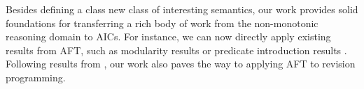 Besides defining a class new class of interesting semantics, our work provides solid foundations for transferring a rich body of work from the non-monotonic reasoning domain to AICs. For instance, we can now directly apply existing results from AFT, such as modularity results \cite{tocl/VennekensGD06,tocl/BogaertsVD16} or predicate introduction results \cite{VennekensMWD07a,VennekensMWD07b}. 
Following results from \citet{tplp/CaropreseT11}, our work also paves the way to applying AFT to revision programming. 

% 
%  


